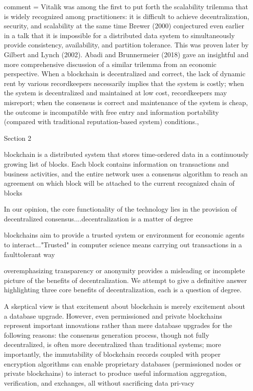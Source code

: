     comment      = {Vitalik was among the first to put forth the scalability trilemma that is widely recognized among practitioners: it is difficult to achieve decentralization, security, and scalability at the same time Brewer (2000) conjectured even earlier in a talk that it is impossible for a distributed data system to simultaneously provide consistency, availability, and partition tolerance. This was proven later by Gilbert and Lynch (2002).  Abadi and Brunnermeier (2018) gave an insightful and more comprehensive discussion of a similar trilemma from an economic perspective. When a blockchain is decentralized and correct, the lack of dynamic rent by various recordkeepers necessarily implies that the system is costly; when the system is decentralized and maintained at low cost, record\-keepers may misreport; when the consensus is correct and maintenance of the system is cheap, the outcome is incompatible with free entry and information portability (compared with traditional reputation-based system) conditions.},

Section 2
    
        blockchain is a distributed system that stores time-ordered data in a continuously growing list of blocks. Each block contains information on transactions and business activities, and the entire network uses a consensus algorithm to reach an agreement on which block will be attached to the current recognized chain of blocks

        In our opinion, the core functionality of the technology lies in the provision of decentralized consensus....decentralization is a matter of degree

        blockchains aim to provide a trusted system or environment for economic agents to interact..."Trusted" in computer science means carrying out transactions in a faulttolerant way

        overemphasizing transparency or anonymity provides a misleading or incomplete picture of the benefits of decentralization. We attempt to give a definitive answer highlighting three core benefits of decentralization, each is a question of degree. 

        A skeptical view is that excitement about blockchain is merely excitement about a database upgrade. However, even permissioned and private blockchains represent important innovations rather than mere database upgrades for the following reasons: the consensus generation process, though not fully decentralized, is often more decentralized than traditional systems; more importantly, the immutability of blockchain records coupled with proper encryption algorithms can enable proprietary databases (permissioned nodes or private blockchains) to interact to produce useful information aggregation, verification, and exchanges, all without sacrificing data pri-vacy

